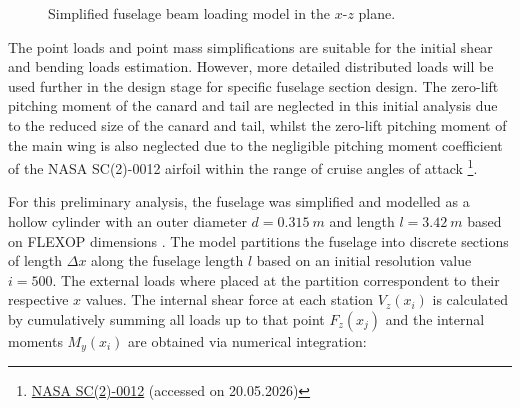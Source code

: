  \begin{figure}[H]
    \centering
    \caption{Simplified fuselage beam loading model in the $x$-$z$ plane.}
    \label{fig:fuselage_loading_model}
\end{figure}

The point loads and point mass simplifications are suitable for the initial shear and bending loads estimation. However, more detailed distributed loads will be used further in the design stage for specific fuselage section design. The zero-lift pitching moment of the canard and tail are neglected in this initial analysis due to the reduced size of the canard and tail, whilst the zero-lift pitching moment of the main wing is also neglected due to the negligible pitching moment coefficient of the NASA SC(2)-0012 airfoil within the range of cruise angles of attack 
\footnote{\label{url:nasa_airfoil}\href{http://airfoiltools.com/airfoil/details?airfoil=sc20012-il#polars}{NASA SC(2)-0012} (accessed on 20.05.2026)}.

For this preliminary analysis, the fuselage was simplified and modelled as a hollow cylinder with an outer diameter $d = 0.315 \ m$ and length $l = 3.42 \ m$ based on FLEXOP dimensions \cite{Yu2022}. The model partitions the fuselage into discrete sections of length $\Delta x$ along the fuselage length $l$ based on an initial resolution value $i=500$. The external loads where placed at the partition correspondent to their respective $x$ values.  The internal shear force at
each station $V_z(x_i)$ is calculated by cumulatively summing all loads up to that point $F_z(x_j)$ and the internal moments $M_y(x_i)$ are obtained via numerical integration:

